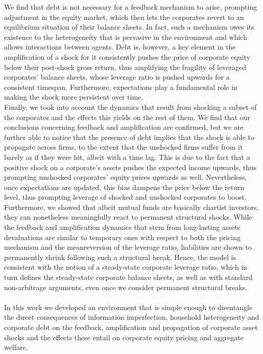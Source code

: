 \documentclass[11pt]{article}
\begin{document}
We find that debt is not necessary for a feedback mechanism to arise, prompting adjustment in the equity market, which then lets the corporates revert to an equilibrium situation of their balance sheets. In fact, such a mechanism owes its existence to the heterogeneity that is pervasive in the environment and which allows interactions between agents. Debt is, however, a key element in the amplification of a shock for it consistently pushes the price of corporate equity below their post-shock gross return, thus amplifying the fragility of leveraged corporates' balance sheets, whose leverage ratio is pushed upwards for a consistent timespan. Furthermore, expectations play a fundamental role in making the shock more persistent over time.\\
Finally, we took into account the dynamics that result from shocking a subset of the corporates and the effects this yields on the rest of them. We find that our conclusions concerning feedback and amplification are confirmed, but we are further able to notice that the presence of debt implies that the shock is able to propagate across firms, to the extent that the unshocked firms suffer from it barely as if they were hit, albeit with a time lag. This is due to the fact that a positive shock on a corporate's assets pushes the expected income upwards, thus prompting unshocked corporates' equity prices upwards as well. Nevertheless, once expectations are updated, this bias dampens the price below the return level, thus prompting leverage of shocked and unshocked corporates to boost.\\
Furthermore, we showed that albeit mutual funds are basically chartist investors, they can nonetheless meaningfully react to permanent structural shocks. While the feedback and amplification dynamics that stem from long-lasting assets devaluations are similar to temporary ones with respect to both the pricing mechanism and the meanreversion of the leverage ratio, liabilities are shown to permanently shrink following such a structural break. Hence, the model is consistent with the notion of a steady-state corporate leverage ratio, which in turn defines the steady-state corporate balance sheets, as well as with standard non-arbitrage arguments, even once we consider permanent structural breaks.\\\\
In this work we developed an environment that is simple enough to disentangle the direct consequences of information imperfection, household heterogeneity and corporate debt on the feedback, amplification and propagation of corporate asset shocks and the effects these entail on corporate equity pricing and aggregate welfare.\\
\end{document}
